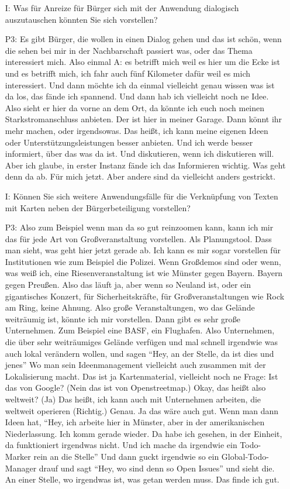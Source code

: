 \begin{itemize}
    \item[I:] Was f{\"u}r Anreize f{\"u}r B{\"u}rger sich mit der Anwendung dialogisch auszutauschen k{\"o}nnten Sie sich vorstellen?
    \item[P3:] Es gibt B{\"u}rger, die wollen in einen Dialog gehen und das ist sch{\"o}n, wenn die sehen bei mir in der Nachbarschaft passiert was, oder das Thema interessiert mich. Also einmal A: es betrifft mich weil es hier um die Ecke ist und es betrifft mich, ich fahr auch f{\"u}nf Kilometer daf{\"u}r weil es mich interessiert. Und dann m{\"o}chte ich da einmal vielleicht genau wissen was ist da los, das f{\"a}nde ich spannend. Und dann hab ich vielleicht noch ne Idee. Also sieht er hier da vorne an dem Ort, da k{\"o}nnte ich euch noch meinen Starkstromanschluss anbieten. Der ist hier in meiner Garage. Dann k{\"o}nnt ihr mehr machen, oder irgendsowas. Das hei{\ss}t, ich kann meine eigenen Ideen oder Unterst{\"u}tzungsleistungen besser anbieten. Und ich werde besser informiert, {\"u}ber das was da ist. Und diskutieren, wenn ich diskutieren will. Aber ich glaube, in erster Instanz f{\"a}nde ich das Informieren wichtig. Was geht denn da ab. F{\"u}r mich jetzt. Aber andere sind da vielleicht anders gestrickt.
    \item[I:] K{\"o}nnen Sie sich weitere Anwendungsf{\"a}lle f{\"u}r die Verkn{\"u}pfung von Texten mit Karten neben der B{\"u}rgerbeteiligung vorstellen?
    \item[P3:] Also zum Beispiel wenn man da so gut reinzoomen kann, kann ich mir das f{\"u}r jede Art von Gro{\ss}veranstaltung vorstellen. Als Planungstool. Dass man sieht, was geht hier jetzt gerade ab. Ich kann es mir sogar vorstellen f{\"u}r Institutionen wie zum Beispiel die Polizei. Wenn Gro{\ss}demos sind oder wenn, was wei{\ss} ich, eine Riesenveranstaltung ist wie M{\"u}nster gegen Bayern. Bayern gegen Preu{\ss}en. Also das l{\"a}uft ja, aber wenn so Neuland ist, oder ein gigantisches Konzert, f{\"u}r Sicherheitskr{\"a}fte, f{\"u}r Gro{\ss}veranstaltungen wie Rock am Ring, keine Ahnung. Also gro{\ss}e Veranstaltungen, wo das Gel{\"a}nde weitr{\"a}umig ist, k{\"o}nnte ich mir vorstellen. Dann gibt es sehr gro{\ss}e Unternehmen. Zum Beispiel eine BASF, ein Flughafen. Also Unternehmen, die {\"u}ber sehr weitr{\"a}umiges Gel{\"a}nde verf{\"u}gen und mal schnell irgendwie was auch lokal ver{\"a}ndern wollen, und sagen "`Hey, an der Stelle, da ist dies und jenes"' Wo man sein Ideenmanagement vielleicht auch zusammen mit der Lokalisierung macht. Das ist ja Kartenmaterial, vielleicht noch ne Frage: Ist das von Google? (Nein das ist von Openstreetmap.) Okay, das hei{\ss}t also weltweit? (Ja) Das hei{\ss}t, ich kann auch mit Unternehmen arbeiten, die weltweit operieren (Richtig.) Genau. Ja das w{\"a}re auch gut. Wenn man dann Ideen hat, "`Hey, ich arbeite hier in M{\"u}nster, aber in der amerikanischen Niederlassung. Ich komm gerade wieder. Da habe ich gesehen, in der Einheit, da funktioniert irgendwas nicht. Und ich mache da irgendwie ein Todo-Marker rein an die Stelle"' Und dann guckt irgendwie so ein Global-Todo-Manager drauf und sagt "`Hey, wo sind denn so Open Issues"' und sieht die. An einer Stelle, wo irgendwas ist, was getan werden muss. Das finde ich gut.

\end{itemize}
